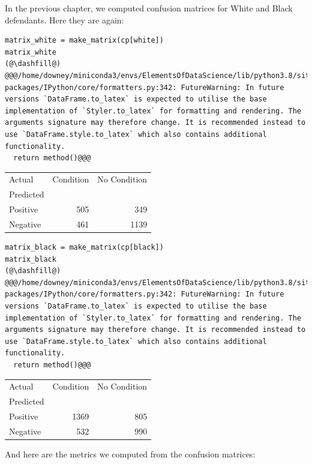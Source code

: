 In the previous chapter, we computed confusion matrices for White and
Black defendants. Here they are again:

\begin{lstlisting}[]
matrix_white = make_matrix(cp[white])
matrix_white
(@\dashfill@)
@@@/home/downey/miniconda3/envs/ElementsOfDataScience/lib/python3.8/site-packages/IPython/core/formatters.py:342: FutureWarning: In future versions `DataFrame.to_latex` is expected to utilise the base implementation of `Styler.to_latex` for formatting and rendering. The arguments signature may therefore change. It is recommended instead to use `DataFrame.style.to_latex` which also contains additional functionality.
  return method()@@@
\end{lstlisting}

\begin{tabular}{lrr}
\midrule
Actual &  Condition &  No Condition \\
Predicted &            &               \\
\midrule
Positive  &        505 &           349 \\
Negative  &        461 &          1139 \\
\midrule
\end{tabular}

\begin{lstlisting}[]
matrix_black = make_matrix(cp[black])
matrix_black
(@\dashfill@)
@@@/home/downey/miniconda3/envs/ElementsOfDataScience/lib/python3.8/site-packages/IPython/core/formatters.py:342: FutureWarning: In future versions `DataFrame.to_latex` is expected to utilise the base implementation of `Styler.to_latex` for formatting and rendering. The arguments signature may therefore change. It is recommended instead to use `DataFrame.style.to_latex` which also contains additional functionality.
  return method()@@@
\end{lstlisting}

\begin{tabular}{lrr}
\midrule
Actual &  Condition &  No Condition \\
Predicted &            &               \\
\midrule
Positive  &       1369 &           805 \\
Negative  &        532 &           990 \\
\midrule
\end{tabular}

And here are the metrics we computed from the confusion matrices:

